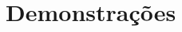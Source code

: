 \documentclass[12pt, a4paper]{article}
\begin{document}

\pagebreak
\tableofcontents
\pagebreak

\section{Demonstrações}


\end{document}
